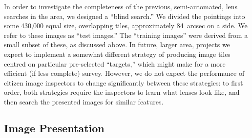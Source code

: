 \documentclass[useAMS,usenatbib,a4paper]{mn2e}
\begin{document}
In order to investigate the completeness of the previous, semi-automated, lens
searches in the \cfhtls area, we designed a ``blind search.'' We divided the
\cfhtls pointings into some 430,000 equal size, overlapping tiles, approximately
84~arcsec on a side. We refer to these images as ``test images.'' The ``training
images'' were derived from a small subset of these, as  discussed above. In
future, larger area, projects we expect to implement a somewhat different
strategy of producing image tiles centred on particular pre-selected
``targets,'' which might make for a more efficient (if less complete) survey.
However, we do not expect the performance of citizen image inspectors to change
significantly between these strategies: to first order, both strategies require
the inspectors to learn what lenses look like, and then search the presented
images for similar features.



\subsection{Image Presentation}
\label{sec:data:display}
\end{document}
